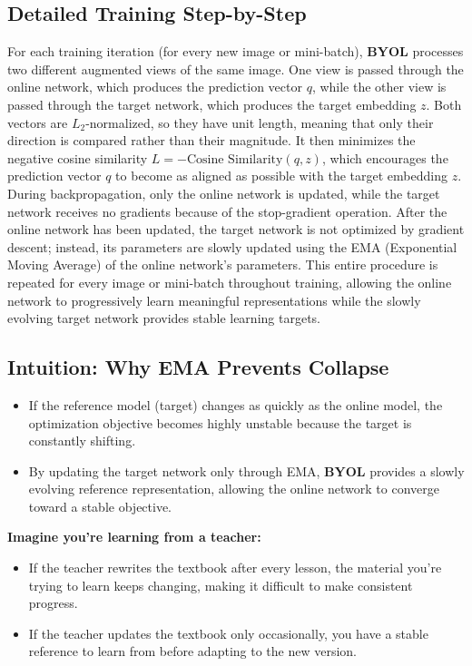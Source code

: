 \subsection{Detailed Training Step-by-Step}

For each training iteration (for every new image or mini-batch), \textbf{BYOL} processes two different augmented views of the same image. One view is passed through the online network, which produces the prediction vector $q$, while the other view is passed through the target network, which produces the target embedding $z$. Both vectors are $L_2$-normalized, so they have unit length, meaning that only their direction is compared rather than their magnitude. It then minimizes the negative cosine similarity $L = -\text{Cosine Similarity}(q, z)$, which encourages the prediction vector $q$ to become as aligned as possible with the target embedding $z$. During backpropagation, only the online network is updated, while the target network receives no gradients because of the stop-gradient operation. After the online network has been updated, the target network is not optimized by gradient descent; instead, its parameters are slowly updated using the EMA (Exponential Moving Average) of the online network's parameters. This entire procedure is repeated for every image or mini-batch throughout training, allowing the online network to progressively learn meaningful representations while the slowly evolving target network provides stable learning targets.

\subsection{Intuition: Why EMA Prevents Collapse}

\begin{itemize}
    \item If the reference model (target) changes as quickly as the online model, the optimization objective becomes highly unstable because the target is constantly shifting.
    \item By updating the target network only through EMA, \textbf{BYOL} provides a slowly evolving reference representation, allowing the online network to converge toward a stable objective.
\end{itemize}

\textbf{Imagine you're learning from a teacher:}
\begin{itemize}
    \item If the teacher rewrites the textbook after every lesson, the material you're trying to learn keeps changing, making it difficult to make consistent progress.
    \item If the teacher updates the textbook only occasionally, you have a stable reference to learn from before adapting to the new version.
\end{itemize}

